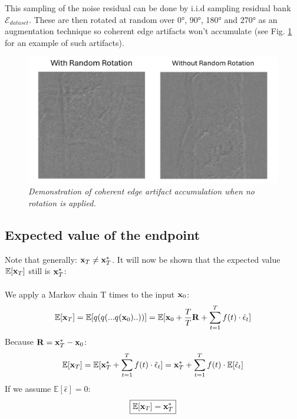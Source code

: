 \documentclass[twocolumn]{article}
\begin{document}
\begin{appendices}
This sampling of the noise residual can be done by i.i.d sampling residual bank $\mathcal{E}_{dataset}$. These are then rotated at random over 0°, 90°, 180° and 270° as an augmentation technique so coherent edge artifacts won't accumulate (see Fig. \ref{fig:edge artifacts} for an example of such artifacts). 

\begin{figure}[h!]
    \centering
    \includegraphics[width=0.8\linewidth]{With-Without_Random_Rotation.png}
    \caption{\textit{Demonstration of coherent edge artifact accumulation when no rotation is applied. }}
    \label{fig:edge artifacts}
\end{figure}

\FloatBarrier

\subsection{Expected value of the endpoint}
Note that generally: $\bold{x}_T \neq \bold{x}_T^*$. It will now be shown that the expected value $\mathbb{E}[\bold{x}_T]$ still is $\bold{x}_T^*$:\\
\\
We apply a Markov chain T times to the input $\bold{x}_0$:\\
\begin{equation}
    \mathbb{E}[\bold{x}_T] = \mathbb{E}[q(q(...q(\bold{x}_0)..))] = \mathbb{E}[\bold{x}_0 + \frac{T}{T} \bold{R} + \sum_{t=1}^{T} f(t) \cdot \hat{\epsilon}_t] 
\end{equation}
Because $\bold{R}= \bold{x}_T^* - \bold{x}_0$:
\begin{equation}
    \mathbb{E}[\bold{x}_T] = \mathbb{E}[\bold{x}_T^* + \sum_{t=1}^{T} f(t) \cdot \hat{\epsilon}_t] = \bold{x}_T^* + \sum_{t=1}^{T} f(t) \cdot \mathbb{E}[\hat{\epsilon}_t]
\end{equation}
If we assume $\mathbb{E}[\hat{\epsilon}] = 0$:
\begin{equation}
    \boxed{\mathbb{E}[\bold{x}_T] = \bold{x}_T^*}
\end{equation}


\end{appendices}
\end{document}
